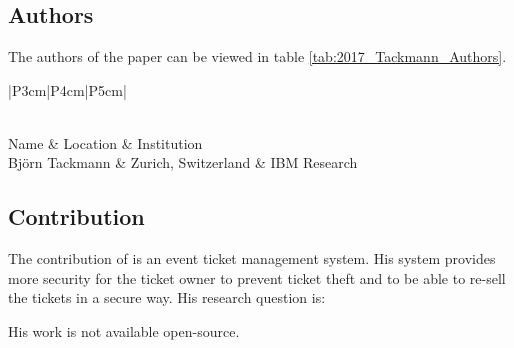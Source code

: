 \clearpage
\section*{\citet{2017_Tackmann}}

\subsection*{Authors}
The authors of the paper can be viewed in table \ref{tab:2017_Tackmann_Authors}.
\begin{longtable}{ |P{3cm}|P{4cm}|P{5cm}| }
	\caption{Authors} \label{tab:2017_Tackmann_Authors} \\
	\hline
 	Name & Location & Institution \\ [0.5ex] 
 	\hline\hline
 	\endhead
 	Björn Tackmann & Zurich, Switzerland  & IBM Research  \\
	 \hline
\end{longtable}


\subsection*{Contribution}
The contribution of \citet{2017_Tackmann} is an event ticket management system. His system provides more security for the ticket owner to prevent ticket theft and to be able to re-sell the tickets in a secure way. His research question is:
\begin{displayquote}
\end{displayquote}
His work is not available open-source.

